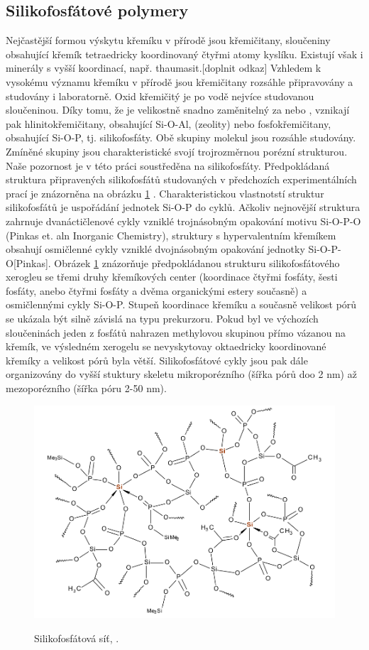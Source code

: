 \documentclass[
  digital, %
  table,   %
  lof,     %
  lot,     %
]{fithesis3}
\begin{document}
\subsection{Silikofosfátové polymery}
Nejčastější formou výskytu křemíku v přírodě jsou křemičitany, sloučeniny obsahující křemík tetraedricky koordinovaný čtyřmi atomy kyslíku. Existují však i minerály s vyšší koordinací, např. thaumasit.[doplnit odkaz] Vzhledem k vysokému významu křemíku v přírodě jsou křemičitany rozsáhle připravovány a studovány i laboratorně. Oxid křemičitý  je po vodě nejvíce studovanou sloučeninou. Díky tomu, že  je velikostně snadno zaměnitelný za  nebo , vznikají pak hlinitokřemičitany, obsahující Si-O-Al, (zeolity) nebo fosfokřemičitany, obsahující Si-O-P, tj. silikofosfáty. Obě skupiny molekul jsou rozsáhle studovány. Zmíněné skupiny jsou charakteristické svojí trojrozměrnou  porézní strukturou. Naše pozornost je v této práci soustředěna na silikofosfáty. Předpokládaná struktura připravených silikofosfátů studovaných v předchozích experimentálních prací je znázorněna na obrázku \ref{si_polymer_cely} \cite{Styskalik2015thesis}. Charakteristickou vlastnotstí struktur silikofosfátů je uspořádání jednotek Si-O-P do cyklů. Ačkoliv nejnovější struktura zahrnuje dvanáctičlenové cykly vzniklé trojnásobným opakování motivu Si-O-P-O (Pinkas et. aln Inorganic Chemistry), struktury s hypervalentním křemíkem obsahují osmičlenné cykly vzniklé dvojnásobným opakování jednotky Si-O-P-O[Pinkas]. Obrázek \ref{si_polymer_cely} znázorňuje předpokládanou strukturu silikofosfátového xerogleu se třemi druhy křemíkových center (koordinace čtyřmi fosfáty, šesti fosfáty, anebo čtyřmi fosfáty a dvěma organickými estery současně) a osmičlennými cykly Si-O-P. Stupeň koordinace křemíku a současně velikost pórů se ukázala být silně závislá na typu prekurzoru. Pokud byl ve výchozích sloučeninách jeden z fosfátů nahrazen methylovou skupinou přímo vázanou na křemík, ve výsledném xerogelu se nevyskytovay oktaedricky koordinované křemíky a velikost pórů byla větší. Silikofosfátové cykly jsou pak dále organizovány do vyšší stuktury skeletu mikroporézního (šířka pórů doo 2 nm) až mezoporézního (šířka póru 2-50 nm).
\begin{figure}[h!]
\caption{Silikofosfátová síť, \cite{Styskalik2015thesis}. }
  \center
  \includegraphics[width=12cm]{si_polymer_cely.png}
  \label{si_polymer_cely}
  \end{figure}
\end{document}
